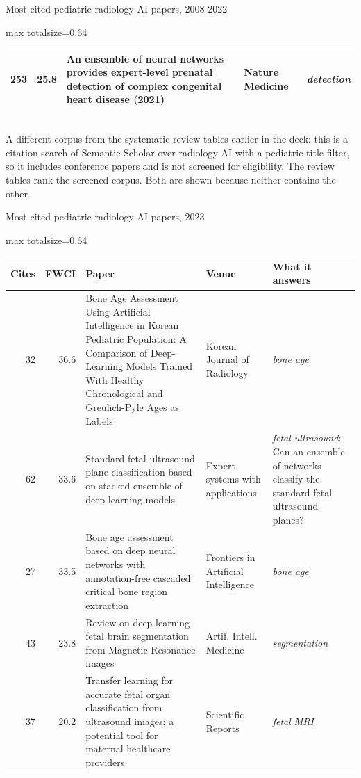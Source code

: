 \documentclass[aspectratio=169]{beamer}
\renewcommand{\arraystretch}{1.08}
\begin{document}
\begin{frame}[category=Journals/Preprints]{Most-cited pediatric radiology AI papers, 2008-2022}
\begin{adjustbox}{max totalsize={\textwidth}{0.64\textheight}}
\begin{tabular}{|r|r|>{\raggedright\arraybackslash}p{}|>{\raggedright\arraybackslash}p{}|>{\raggedright\arraybackslash}p{}|}
253 & 25.8 & An ensemble of neural networks provides expert-level prenatal detection of complex congenital heart disease (2021) & Nature Medicine & \textit{detection} \\ \hline
\end{tabular}
\end{adjustbox}
\\[2pt]
{\tiny A different corpus from the systematic-review tables earlier in the deck: this is a citation search of
Semantic Scholar over radiology AI with a pediatric title filter, so it includes conference papers and is not
screened for eligibility. The review tables rank the screened corpus. Both are shown because neither contains
the other.}
\end{frame}

\begin{frame}[category=Journals/Preprints]{Most-cited pediatric radiology AI papers, 2023}
\tiny
\begin{adjustbox}{max totalsize={\textwidth}{0.64\textheight}}
\renewcommand{\arraystretch}{1.2}
\begin{tabular}{|r|r|>{\raggedright\arraybackslash}p{}|>{\raggedright\arraybackslash}p{}|>{\raggedright\arraybackslash}p{}|}
\hline \textbf{Cites} & \textbf{FWCI} & \textbf{Paper} & \textbf{Venue} & \textbf{What it answers} \\ \hline
32 & 36.6 & Bone Age Assessment Using Artificial Intelligence in Korean Pediatric Population: A Comparison of Deep-Learning Models Trained With Healthy Chronological and Greulich-Pyle Ages as Labels & Korean Journal of Radiology & \textit{bone age} \\ \hline
62 & 33.6 & Standard fetal ultrasound plane classification based on stacked ensemble of deep learning models & Expert systems with applications & \textit{fetal ultrasound}: Can an ensemble of networks classify the standard fetal ultrasound planes? \\ \hline
27 & 33.5 & Bone age assessment based on deep neural networks with annotation-free cascaded critical bone region extraction & Frontiers in Artificial Intelligence & \textit{bone age} \\ \hline
43 & 23.8 & Review on deep learning fetal brain segmentation from Magnetic Resonance images & Artif. Intell. Medicine & \textit{segmentation} \\ \hline
37 & 20.2 & Transfer learning for accurate fetal organ classification from ultrasound images: a potential tool for maternal healthcare providers & Scientific Reports & \textit{fetal MRI} \\ \hline

\end{tabular}
\end{adjustbox}
\end{frame}
\end{document}
